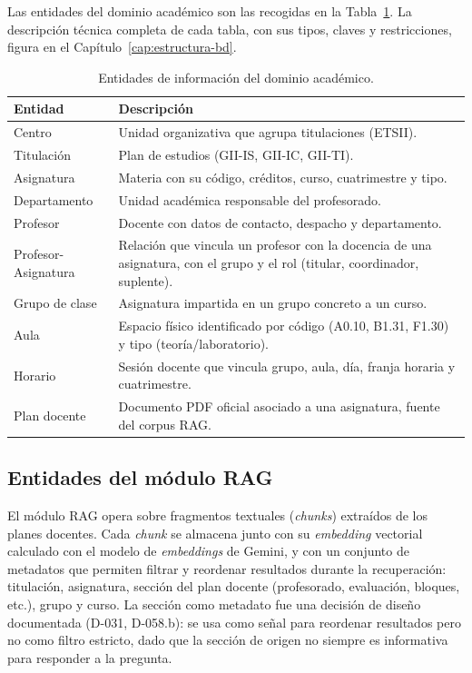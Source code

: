 Las entidades del dominio académico son las recogidas en la Tabla~\ref{tab:ri-dominio}. La descripción técnica completa de cada tabla, con sus tipos, claves y restricciones, figura en el Capítulo~\ref{cap:estructura-bd}.

\begin{table}[hbtp]
\centering
\small
\caption{Entidades de información del dominio académico.}\label{tab:ri-dominio}
\begin{tabular}{|p{2.8cm}|p{9.0cm}|}
\hline
\textbf{Entidad} & \textbf{Descripción} \\ \hline
Centro & Unidad organizativa que agrupa titulaciones (ETSII). \\ \hline
Titulación & Plan de estudios (GII-IS, GII-IC, GII-TI). \\ \hline
Asignatura & Materia con su código, créditos, curso, cuatrimestre y tipo. \\ \hline
Departamento & Unidad académica responsable del profesorado. \\ \hline
Profesor & Docente con datos de contacto, despacho y departamento. \\ \hline
Profesor-Asignatura & Relación que vincula un profesor con la docencia de una asignatura, con el grupo y el rol (titular, coordinador, suplente). \\ \hline
Grupo de clase & Asignatura impartida en un grupo concreto a un curso. \\ \hline
Aula & Espacio físico identificado por código (A0.10, B1.31, F1.30) y tipo (teoría/laboratorio). \\ \hline
Horario & Sesión docente que vincula grupo, aula, día, franja horaria y cuatrimestre. \\ \hline
Plan docente & Documento PDF oficial asociado a una asignatura, fuente del corpus RAG. \\ \hline
\end{tabular}
\end{table}

\subsection{Entidades del módulo RAG}\label{subsec:ri-rag}

El módulo RAG opera sobre fragmentos textuales (\textit{chunks}) extraídos de los planes docentes. Cada \textit{chunk} se almacena junto con su \textit{embedding} vectorial calculado con el modelo de \textit{embeddings} de Gemini, y con un conjunto de metadatos que permiten filtrar y reordenar resultados durante la recuperación: titulación, asignatura, sección del plan docente (profesorado, evaluación, bloques, etc.), grupo y curso. La sección como metadato fue una decisión de diseño documentada (D-031, D-058.b): se usa como señal para reordenar resultados pero no como filtro estricto, dado que la sección de origen no siempre es informativa para responder a la pregunta.

